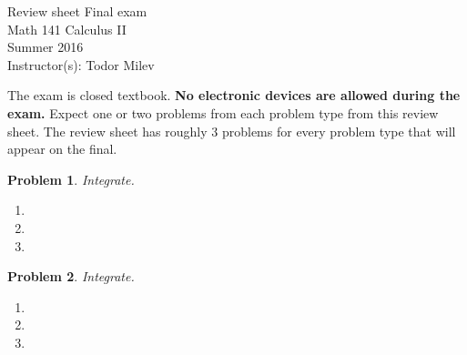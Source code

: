 \documentclass{article}
\renewcommand{\fcProblemRef}{\theproblem.\theenumi}
\newtheorem{problem}{Problem}
\begin{document}
\begin{center}
\Large
Review sheet Final exam \\ Math 141 Calculus II \\ \normalsize Summer 2016 \\ Instructor(s): Todor Milev
\end{center}



\noindent The exam is closed textbook. \textbf{No electronic devices are allowed during the exam. } Expect one or two problems from each problem type from this review sheet. The review sheet has roughly 3 problems for every problem type that will appear on the final.


\begin{problem}Integrate.
\begin{enumerate}[ref={\fcProblemRef}]
\item 
\item 
\item 
\end{enumerate}
\end{problem}






\begin{problem}Integrate.
\begin{enumerate}
\item 
\item 
\item 
\end{enumerate}
\end{problem}
\end{document}
